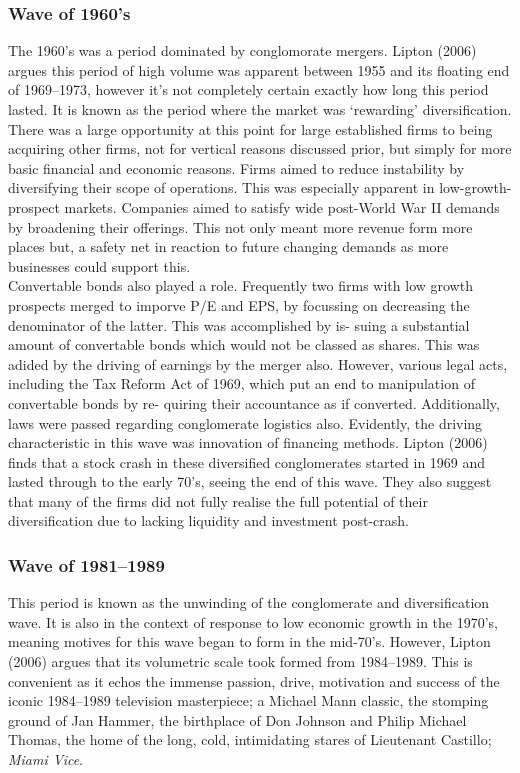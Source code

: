 \documentclass[11pt, english]{article}
\begin{document}
		\subsubsection*{Wave of 1960's}

	The 1960's was a period dominated by conglomorate mergers. Lipton (2006) argues this period of high volume was apparent between 1955 and its floating end of 1969--1973, however it's not completely certain exactly how long this period lasted. It is known as the period where the market was ‘rewarding’ diversification. There was a large opportunity at this point for large established firms to being acquiring other firms, not for vertical reasons discussed prior, but simply for more basic financial and economic reasons. Firms aimed to reduce instability by diversifying their scope of operations. This was especially apparent in low-growth-prospect markets. Companies aimed to satisfy wide post-World War II demands by broadening their offerings. This not only meant more revenue form more places but, a safety net in reaction to future changing demands as more businesses could support this.\\

	Convertable bonds also played a role. Frequently two firms with low growth prospects merged to imporve P/E and EPS, by focussing on decreasing the denominator of the latter. This was accomplished by is- suing a substantial amount of convertable bonds which would not be classed as shares. This was adided by the driving of earnings by the merger also. However, various legal acts, including the Tax Reform Act of 1969, which put an end to manipulation of convertable bonds by re- quiring their accountance as if converted. Additionally, laws were passed regarding conglomerate logistics also. Evidently, the driving characteristic in this wave was innovation of financing methods. Lipton (2006) finds that a stock crash in these diversified conglomerates started in 1969 and lasted through to the early 70's, seeing the end of this wave. They also suggest that many of the firms did not fully realise the full potential of their diversification due to lacking liquidity and investment post-crash.

		\subsubsection*{Wave of 1981--1989}

	This period is known as the unwinding of the conglomerate and diversification wave. It is also in the context of response to low economic growth in the 1970's, meaning motives for this wave began to form in the mid-70's. However, Lipton (2006) argues that its volumetric scale took formed from 1984--1989. This is convenient as it echos the immense passion, drive, motivation and success of the iconic 1984--1989 television masterpiece; a Michael Mann classic, the stomping ground of Jan Hammer, the birthplace of Don Johnson and Philip Michael Thomas, the home of the long, cold, intimidating stares of Lieutenant Castillo; \textit{Miami Vice}.\\
\end{document}
